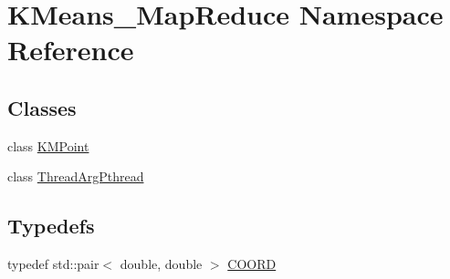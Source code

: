 \hypertarget{namespaceKMeans__MapReduce}{\section{K\-Means\-\_\-\-Map\-Reduce Namespace Reference}
\label{namespaceKMeans__MapReduce}
}
\subsection*{Classes}
\begin{DoxyCompactItemize}
\item 
class \hyperlink{classKMeans__MapReduce_1_1KMPoint}{K\-M\-Point}
\item 
class \hyperlink{classKMeans__MapReduce_1_1ThreadArgPthread}{Thread\-Arg\-Pthread}
\end{DoxyCompactItemize}
\subsection*{Typedefs}
\begin{DoxyCompactItemize}
\item 
typedef std\-::pair$<$ double, double $>$ \hyperlink{namespaceKMeans__MapReduce_a8dfbbc4a186c8ea8ae691f4a85db53e3}{C\-O\-O\-R\-D}
\end{DoxyCompactItemize}

